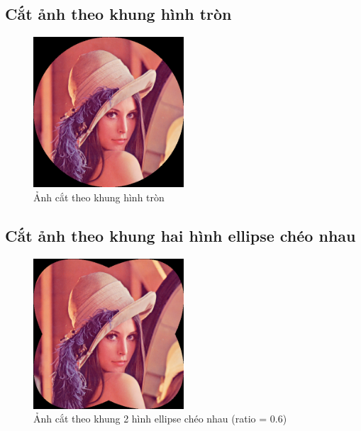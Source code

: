 \subsection{Cắt ảnh theo khung hình tròn}

\begin{figure}[H]
	\centering
	\includegraphics[width=0.5\textwidth]{imgs/lena_crop_circle.png}
	\caption{Ảnh cắt theo khung hình tròn}
\end{figure}

\subsection{Cắt ảnh theo khung hai hình ellipse chéo nhau}

\begin{figure}[H]
	\centering
	\includegraphics[width=0.5\textwidth]{imgs/lena_crop_ellipse.png}
	\caption{Ảnh cắt theo khung 2 hình ellipse chéo nhau (ratio = 0.6)}
\end{figure}

